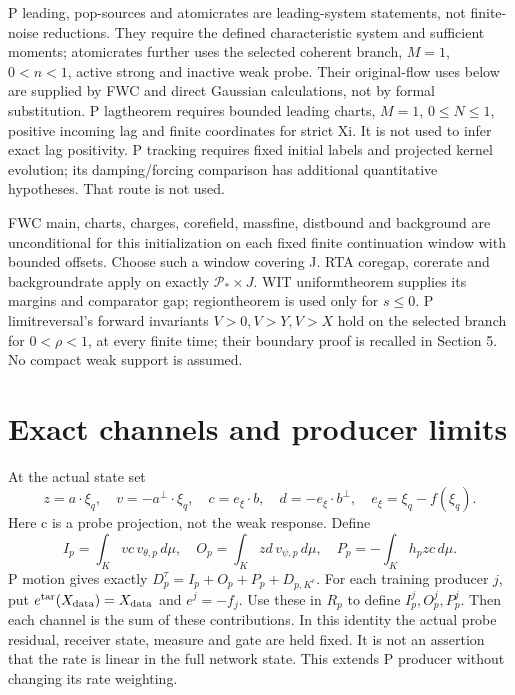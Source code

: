 \documentclass[11pt]{article}
\newcommand{\dd}{\,d}\newcommand{\E}{\mathbb E}
\begin{document}
P leading, pop-sources and atomicrates are leading-system statements,
not finite-noise reductions. They require the defined characteristic
system and sufficient moments; atomicrates further uses the selected
coherent branch, \(M=1\), \(0<n<1\), active strong and inactive weak
probe. Their original-flow uses below are supplied by FWC and direct
Gaussian calculations, not by formal substitution.
P lagtheorem requires bounded leading charts, \(M=1\), \(0\le N\le1\),
positive incoming lag and finite coordinates for strict Xi. It is not
used to infer exact lag positivity. P tracking requires fixed initial
labels and projected kernel evolution; its damping/forcing comparison
has additional quantitative hypotheses. That route is not used.

FWC main, charts, charges, corefield, massfine, distbound and background
are unconditional for this initialization on each fixed finite continuation
window with bounded offsets. Choose such a window covering J.
RTA coregap, corerate and backgroundrate apply on exactly
\(\mathcal P_*\times J\). WIT uniformtheorem supplies its margins
and comparator gap; regiontheorem is used only for \(s\le0\).
P limitreversal's forward invariants \(V>0,V>Y,V>X\) hold on the
selected branch for \(0<\rho<1\), at every finite time; their boundary
proof is recalled in Section 5. No compact weak support is assumed.

\section{Exact channels and producer limits}\label{an01cpdv1:channels}
At the actual state set
\[
z=a\cdot\xi_q,\quad v=-a^\perp\cdot\xi_q,\quad
c=e_\xi\cdot b,\quad d=-e_\xi\cdot b^\perp,\quad e_\xi=\xi_q-f(\xi_q).
\]
Here c is a probe projection, not the weak response. Define
\[
I_p=\int_K vc\,v_{\theta,p}\dd\mu,\quad
O_p=\int_K zd\,v_{\psi,p}\dd\mu,\quad
P_p=-\int_K h_pzc\dd\mu.
\]
P motion gives exactly \(D_p^\tau=I_p+O_p+P_p+D_{p,K^c}\).
For each training producer \(j\), put
\(e^{\rm tar}(X_{\rm data})=X_{\rm data}\) and \(e^j=-f_j\).
Use these in \(R_p\) to define \(I_p^j,O_p^j,P_p^j\).
Then each channel is the sum of these contributions. In this identity
the actual probe residual, receiver state, measure and gate are held fixed.
It is not an assertion that the rate is linear in the full network state.
This extends P producer without changing its rate weighting.
\end{document}
